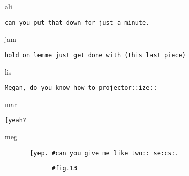 \documentclass[output=paper,nonflat,modfont,draft]{langsci/langscibook}
\begin{document}
\begin{mdframedkendrick}[style=firstfoc]
\begin{transbox}{10}{ali}
\begin{verbatim}
can you put that down for just a minute.
\end{verbatim}
\end{transbox}
\end{mdframedkendrick}\vspace{-5mm}

\begin{mdframedkendrick}[style=secondfoc]
\begin{transbox}{11}{jam}
\begin{verbatim}
hold on lemme just get done with (this last piece)
\end{verbatim}
\end{transbox}
\end{mdframedkendrick}\vspace{-4mm}


\begin{mdframedkendrick}[style=firstfoc] %
\begin{transbox}{1}{lis}
\begin{verbatim}
Megan, do you know how to projector::ize::
\end{verbatim}
\end{transbox}
\end{mdframedkendrick}\vspace{-5mm}

\emptytransbox{2}{
[↑th:i:[ng:s:?
}

\begin{transbox}{3}{mar}
\begin{verbatim}
[yeah?
\end{verbatim}
\end{transbox}

\begin{mdframedkendrick}[style=secondfoc]
\begin{transbox}{4}{meg}
\begin{verbatim}
       [yep. #can you give me like two:: se:cs:.
\end{verbatim}
\end{transbox}
\end{mdframedkendrick}\vspace{-5mm}

\begin{transbox}{5}{\fig}
\begin{verbatim}
             #fig.13
\end{verbatim}
\end{transbox}\bigskip
\end{document}
